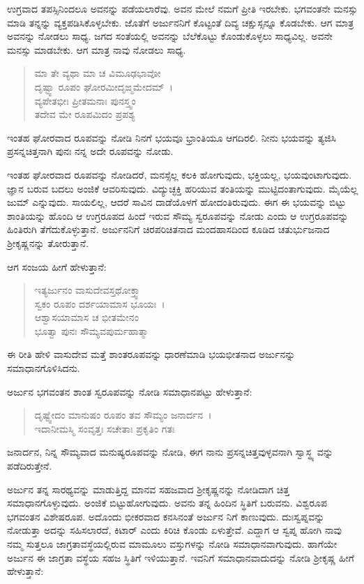 ಉಗ್ರವಾದ ತಪಸ್ಸಿನಿಂದಲೂ ಅವನನ್ನು ಪಡೆಯಲಾರೆವು. ಅವನ ಮೇಲೆ ನಮಗೆ ಪ್ರೀತಿ ಇರಬೇಕು. ಭಗವಂತನೇ ಮನಸ್ಸು ಮಾಡಿ ತನ್ನನ್ನು ವ್ಯಕ್ತಪಡಿಸಿಕೊಳ್ಳಬೇಕು. ಜೊತೆಗೆ ಅರ್ಜುನನಿಗೆ ಕೊಟ್ಟಂತೆ ದಿವ್ಯ ಚಕ್ಷುಸ್ಸನ್ನೂ ಕೊಡಬೇಕು. ಆಗ ಮಾತ್ರ ಅವನನ್ನು ನೋಡಲು ಸಾಧ್ಯ. ಜಗದ ಸಂತೆಯಲ್ಲಿ ಅವನನ್ನು ಬೆಲೆಕೊಟ್ಟು ಕೊಂಡುಕೊಳ್ಳಲು ಸಾಧ್ಯವಿಲ್ಲ. ಅವನೇ ಮನಸ್ಸು ಮಾಡಬೇಕು. ಆಗ ಮಾತ್ರ ನಾವು ನೋಡಲು ಸಾಧ್ಯ.

\begin{verse}
ಮಾ ತೇ ವ್ಯಥಾ ಮಾ ಚ ವಿಮೂಢಭಾವೋ \\ ದೃಷ್ಟ್ವಾ ರೂಪಂ ಘೋರಮೀದೃಙ್ಮಮೇದಮ್~।\\ವ್ಯಪೇತಭೀಃ ಪ್ರೀತಮನಾಃ ಪುನಸ್ತ್ವಂ \\ ತದೇವ ಮೇ ರೂಪಮಿದಂ ಪ್ರಪಶ್ಯ 
\end{verse}

{\small ಇಂತಹ ಘೋರವಾದ ರೂಪವನ್ನು ನೋಡಿ ನಿನಗೆ ಭಯವೂ ಭ್ರಾಂತಿಯೂ ಆಗದಿರಲಿ. ನೀನು ಭಯವನ್ನು ತ್ಯಜಿಸಿ ಪ್ರಸನ್ನಚಿತ್ತನಾಗಿ ಪುನಃ ನನ್ನ ಅದೇ ರೂಪವನ್ನು ನೋಡು.}

ಇಂತಹ ಘೋರವಾದ ರೂಪವನ್ನು ನೋಡಿದರೆ, ಮನಸ್ಸೆಲ್ಲ ಕಲಕಿ ಹೋಗುವುದು, ಭಕ್ತಿಯಲ್ಲ, ಭಯವುಂಟಾಗುವುದು. ಜ್ಞಾನ ಬರುವ ಬದಲು ಅಂಜಿಕೆ ಆವರಿಸುವುದು. ವಿದ್ಯುಚ್ಛಕ್ತಿ ಹರಿಯುವ ತಂತಿಯನ್ನು ಮುಟ್ಟಿದಂತಾಗುವುದು. ಮೈಯೆಲ್ಲ ಜುಮ್ ಎನ್ನುವುದು. ಸಾಯಲಿಲ್ಲ, ಆದರೆ ಸಾವಿನ ದಾಡೆಯೊಳಗೆ ಹೋದಂತಿರುವುದು. ಈಗ ಈ ಭಯವನ್ನು ಬಿಟ್ಟು ಶಾಂತಿಯನ್ನು ಹೊಂದಿ ಆ ಉಗ್ರರೂಪದ ಹಿಂದೆ ಇರುವ ಸೌಮ್ಯ ಸ್ವರೂಪವನ್ನು ನೋಡು ಎಂದು ಆ ಉಗ್ರರೂಪವನ್ನು ಹಿಂತಿರುಗಿ ತೆಗೆದುಕೊಳ್ಳುತ್ತಾನೆ. ಅರ್ಜುನನಿಗೆ ಚಿರಪರಿಚಿತನಾದ ಮಂದಹಾಸದಿಂದ ಕೂಡಿದ ಚತುರ್ಭುಜನಾದ ಶ‍್ರೀಕೃಷ್ಣನನ್ನು ತೋರುತ್ತಾನೆ.

ಆಗ ಸಂಜಯ ಹೀಗೆ ಹೇಳುತ್ತಾನೆ:

\begin{verse}
ಇತ್ಯರ್ಜುನಂ ವಾಸುದೇವಸ್ತಥೋಕ್ತ್ವಾ \\ ಸ್ವಕಂ ರೂಪಂ ದರ್ಶಯಾಮಾಸ ಭೂಯಃ~।\\ಆಶ್ವಾಸಯಾಮಾಸ ಚ ಭೀತಮೇನಂ \\ ಭೂತ್ವಾ ಪುನಃ ಸೌಮ್ಯವಪುರ್ಮಹಾತ್ಮಾ 
\end{verse}

{\small ಈ ರೀತಿ ಹೇಳಿ ವಾಸುದೇವ ಮತ್ತೆ ಶಾಂತರೂಪವನ್ನು ಧಾರಣೆಮಾಡಿ ಭಯಭೀತನಾದ ಅರ್ಜುನನ್ನು ಸಮಾಧಾನಗೊಳಿಸಿದನು.}

ಅರ್ಜುನ ಭಗವಂತನ ಶಾಂತ ಸ್ವರೂಪವನ್ನು ನೋಡಿ ಸಮಾಧಾನಪಟ್ಟು ಹೇಳುತ್ತಾನೆ:

\begin{verse}
ದೃಷ್ಟ್ವೇದಂ ಮಾನುಷಂ ರೂಪಂ ತವ ಸೌಮ್ಯಂ ಜನಾರ್ದನ~।\\ಇದಾನೀಮಸ್ಮಿ ಸಂವೃತ್ತಃ ಸಚೇತಾಃ ಪ್ರಕೃತಿಂ ಗತಃ 
\end{verse}

{\small ಜನಾರ್ದನ, ನಿನ್ನ ಸೌಮ್ಯವಾದ ಮನುಷ್ಯರೂಪವನ್ನು ನೋಡಿ, ಈಗ ನಾನು ಪ್ರಸನ್ನಚಿತ್ತವುಳ್ಳವನಾಗಿ ಸ್ವಾಸ್ಥ್ಯ ವನ್ನು ಪಡೆದಿರುತ್ತೇನೆ.}

ಅರ್ಜುನ ತನ್ನ ಸಾರಥ್ಯವನ್ನು ಮಾಡುತ್ತಿದ್ದ ಮಾನವ ಸಹಜವಾದ ಶ‍್ರೀಕೃಷ್ಣನನ್ನು ನೋಡಿದಾಗ ಚಿತ್ತ ಸಮಾಧಾನಗೊಳ್ಳುವುದು. ಅಂಜಿಕೆ ಬಿಟ್ಟುಹೋಗುವುದು. ಅವನು ತನ್ನ ಹಿಂದಿನ ಸ್ಥಿತಿಗೆ ಬರುವನು. ವಿಶ್ವರೂಪ ಭಗವಂತನ ವಿಶೇಷರೂಪ. ಅದೊಂದು ಭೀಕರವಾದ ಕನಸಿನಂತೆ ಅರ್ಜುನ ನಿಗೆ ಕಾಣುವುದು. ದುಃಸ್ವಪ್ನವನ್ನು ನೋಡುತ್ತಾ ಅದನ್ನು ಸಹಿಸಲಾರದೆ, ಕಿಟಾರ್ ಎಂದು ಕಿರಿಚಿ ಕೊಂಡು ಏಳುತ್ತೇವೆ. ಎದ್ದಾಗ ಆ ಸ್ವಪ್ನ ಹೋಗಿ ನಾವು ನಮ್ಮ ಸುತ್ತಲೂ ಜಾಗ್ರತಾವಸ್ಥೆಯಲ್ಲಿರುವ ಮಾಮೂಲು ವಸ್ತುಗಳನ್ನು ನೋಡಿ ಸಮಾಧಾನವಾಗುವುದು. ಹಾಗೆಯೇ ಅರ್ಜುನ ಈ ಜಾಗ್ರತಾ ವಸ್ಥೆಯ ಸಹಜ ಸ್ಥಿತಿಗೆ ಇಳಿಯುತ್ತಾನೆ. ಇವನಿಗೆ ಸಮಾಧಾನವಾದುದನ್ನು ನೋಡಿ ಶ‍್ರೀಕೃಷ್ಣ ಹೀಗೆ ಹೇಳುತ್ತಾನೆ:

